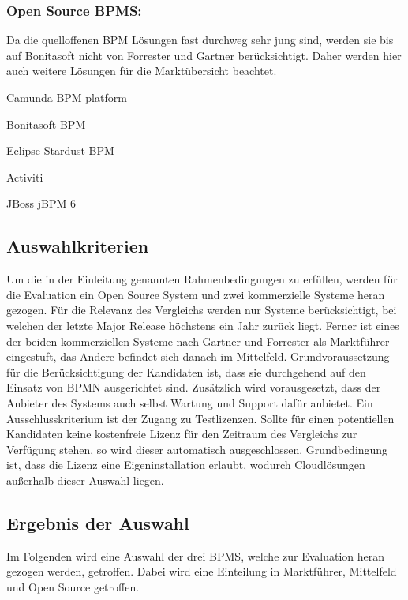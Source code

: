 \subsubsection*{Open Source \ac{BPMS}:}
Da die quelloffenen \ac{BPM} Lösungen fast durchweg sehr jung sind, werden sie bis auf Bonitasoft nicht von Forrester und Gartner berücksichtigt. Daher werden hier auch weitere Lösungen für die Marktübersicht beachtet.

\begin{compactitem}
	\item Camunda BPM platform
	\item Bonitasoft BPM
	\item Eclipse Stardust BPM
	\item Activiti
	\item JBoss jBPM 6
\end{compactitem}

\subsection{Auswahlkriterien}
\label{auswahlKriterien}
Um die in der Einleitung genannten Rahmenbedingungen zu erfüllen, werden für die Evaluation ein Open Source System und zwei kommerzielle Systeme heran gezogen. Für die Relevanz des Vergleichs werden nur Systeme berücksichtigt, bei welchen der letzte Major Release höchstens ein Jahr zurück liegt. Ferner ist eines der beiden kommerziellen Systeme nach Gartner und Forrester als Marktführer eingestuft, das Andere befindet sich danach im Mittelfeld. Grundvoraussetzung  für die Berücksichtigung der Kandidaten ist, dass sie durchgehend auf den Einsatz von \ac{BPMN} ausgerichtet sind. Zusätzlich wird vorausgesetzt, dass der Anbieter des Systems auch selbst Wartung und Support dafür anbietet.
Ein Ausschlusskriterium ist der Zugang zu Testlizenzen. Sollte für einen potentiellen Kandidaten keine kostenfreie Lizenz für den Zeitraum des Vergleichs zur Verfügung stehen, so wird dieser automatisch ausgeschlossen. Grundbedingung ist, dass die Lizenz eine Eigeninstallation erlaubt, wodurch Cloudlösungen außerhalb dieser Auswahl liegen.

\subsection{Ergebnis der Auswahl}
\label{ergebnisAuswahl}
Im Folgenden wird eine Auswahl der drei \ac{BPMS}, welche zur Evaluation heran gezogen werden, getroffen. Dabei wird eine Einteilung in Marktführer, Mittelfeld und Open Source getroffen. 

